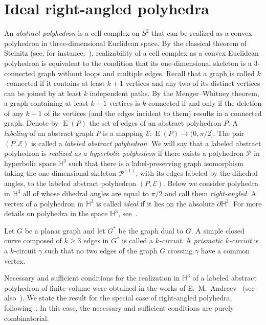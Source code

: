 \documentclass{amsart}
\begin{document}
\section{Ideal right-angled polyhedra} \label{prelim-ideal}
	
An \textit{abstract polyhedron} is a cell complex on $S^2$ that can be realized as a convex polyhedron in three-dimensional Euclidean space. By the classical theorem of Steinitz (see, for instance,~\cite[Ch.~1]{Pra}), realizability of a cell complex as a convex Euclidean polyhedron is equivalent to the condition that its one-dimensional skeleton is a $3$-connected graph without loops and multiple edges. Recall that a graph is called $k$-connected if it contains at least $k+1$ vertices and any two of its distinct vertices can be joined by at least $k$ independent paths. By the Menger--Whitney theorem, a graph containing at least $k+1$ vertices is $k$-connected if and only if the deletion of any $k-1$ of its vertices (and the edges incident to them) results in a connected graph. Denote by $\operatorname{E} (P)$ the set of edges of an abstract polyhedron $P$. A \textit{labeling} of an abstract graph $P$ is a mapping $\mathcal E : \operatorname{E}(P) \to (0,\pi/2]$. The pair $(P, \mathcal E)$ is called a \textit{labeled abstract polyhedron}. We will say that a labeled abstract polyhedron is \textit{realized as a hyperbolic polyhedron} if there exists a polyhedron $\mathcal P$ in hyperbolic space $\mathbb H^3$ such that there is a label-preserving graph isomorphism taking the one-dimensional skeleton $\mathcal P^{(1)}$, with its edges labeled by the dihedral angles, to the labeled abstract polyhedron $(P, \mathcal E)$. Below we consider polyhedra in $\mathbb H^3$ all of whose dihedral angles are equal to $\pi/2$ and call them \textit{right-angled}. A vertex of a polyhedron in $\mathbb H^3$ is called \textit{ideal} if it lies on the absolute $\partial \mathbb H^3$. For more details on polyhedra in the space $\mathbb H^3$, see~\cite{AVS}.

Let $G$ be a planar graph and let $G^*$ be the graph dual to $G$. A simple closed curve composed of $k \geq 3$ edges in $G^*$ is called a \textit{$k$-circuit}. A \textit{prismatic $k$-circuit} is a $k$-circuit $\gamma$ such that no two edges of the graph $G$ crossing $\gamma$ have a common vertex.

Necessary and sufficient conditions for the realization in $\mathbb H^3$ of a labeled abstract polyhedron of finite volume were obtained in the works of E.~M.~Andreev~\cite{Andreev1, Andreev2} (see also~\cite{RHD}). We state the result for the special case of right-angled polyhedra, following~\cite{At09}. In this case, the necessary and sufficient conditions are purely combinatorial.
	
\end{document}
